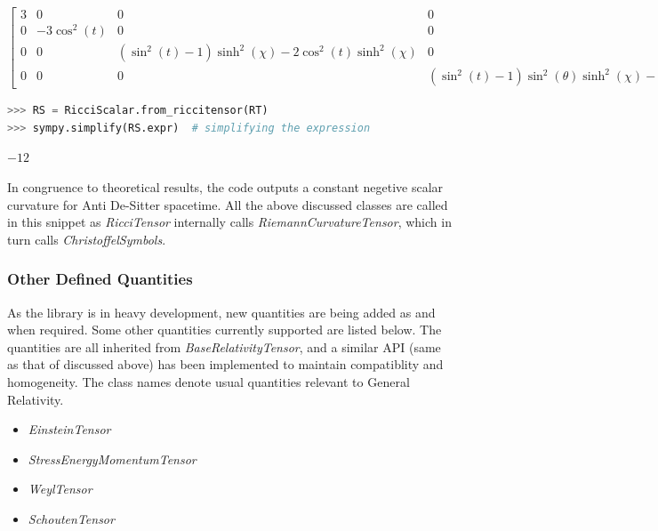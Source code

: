 \documentclass[refree]{aa}
\begin{document}
\begin{center}
$\displaystyle \left[\begin{matrix}3 & 0 & 0 & 0\\0 & - 3 \cos^{2}{\left(t \right)} & 0 & 0\\0 & 0 & \left(\sin^{2}{\left(t \right)} - 1\right) \sinh^{2}{\left(\chi \right)} - 2 \cos^{2}{\left(t \right)} \sinh^{2}{\left(\chi \right)} & 0\\0 & 0 & 0 & \left(\sin^{2}{\left(t \right)} - 1\right) \sin^{2}{\left(\theta \right)} \sinh^{2}{\left(\chi \right)} - 2 \sin^{2}{\left(\theta \right)} \cos^{2}{\left(t \right)} \sinh^{2}{\left(\chi \right)}\end{matrix}\right]$
\end{center}

\begin{lstlisting}[language=Python, caption=Deriving Ricci(Curvature) Scalar from Ricci Tensor]
>>> RS = RicciScalar.from_riccitensor(RT)
>>> sympy.simplify(RS.expr)  # simplifying the expression
\end{lstlisting}

\begin{center}
$\displaystyle -12$
\end{center}


In congruence to theoretical results, the code outputs a constant negetive scalar curvature for Anti De-Sitter spacetime. All the above discussed classes are called in this snippet as \textit{RicciTensor} internally calls \textit{RiemannCurvatureTensor}, which in turn calls \textit{ChristoffelSymbols}.


\subsubsection{Other Defined Quantities}\label{subsubsec:other}

As the library is in heavy development, new quantities are being added as and when required. Some other quantities currently supported are listed below. The quantities are all inherited from \textit{BaseRelativityTensor}, and a similar API (same as that of discussed above) has been implemented to maintain compatiblity and homogeneity. The class names denote usual quantities relevant to General Relativity.

\begin{itemize}
\item \textit{EinsteinTensor}
\item \textit{StressEnergyMomentumTensor}
\item \textit{WeylTensor}
\item \textit{SchoutenTensor}
\end{itemize}
\end{document}
